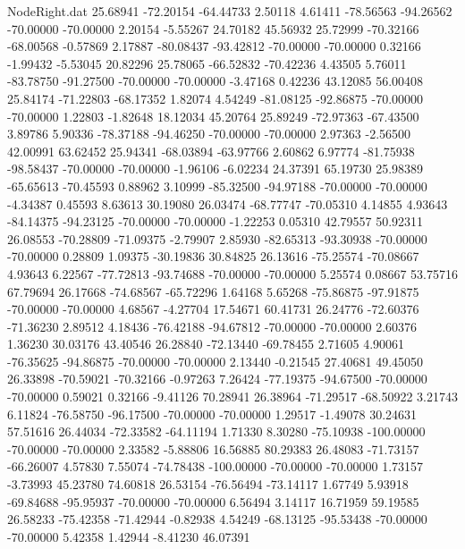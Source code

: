 \begin{filecontents}{NodeRight.dat}
  25.68941  -72.20154  -64.44733     2.50118    4.61411  -78.56563  -94.26562  -70.00000  -70.00000    2.20154   -5.55267   24.70182   45.56932
  25.72999  -70.32166  -68.00568    -0.57869    2.17887  -80.08437  -93.42812  -70.00000  -70.00000    0.32166   -1.99432   -5.53045   20.82296
  25.78065  -66.52832  -70.42236     4.43505    5.76011  -83.78750  -91.27500  -70.00000  -70.00000   -3.47168    0.42236   43.12085   56.00408
  25.84174  -71.22803  -68.17352     1.82074    4.54249  -81.08125  -92.86875  -70.00000  -70.00000    1.22803   -1.82648   18.12034   45.20764
  25.89249  -72.97363  -67.43500     3.89786    5.90336  -78.37188  -94.46250  -70.00000  -70.00000    2.97363   -2.56500   42.00991   63.62452
  25.94341  -68.03894  -63.97766     2.60862    6.97774  -81.75938  -98.58437  -70.00000  -70.00000   -1.96106   -6.02234   24.37391   65.19730
  25.98389  -65.65613  -70.45593     0.88962    3.10999  -85.32500  -94.97188  -70.00000  -70.00000   -4.34387    0.45593    8.63613   30.19080
  26.03474  -68.77747  -70.05310     4.14855    4.93643  -84.14375  -94.23125  -70.00000  -70.00000   -1.22253    0.05310   42.79557   50.92311
  26.08553  -70.28809  -71.09375    -2.79907    2.85930  -82.65313  -93.30938  -70.00000  -70.00000    0.28809    1.09375  -30.19836   30.84825
  26.13616  -75.25574  -70.08667     4.93643    6.22567  -77.72813  -93.74688  -70.00000  -70.00000    5.25574    0.08667   53.75716   67.79694
  26.17668  -74.68567  -65.72296     1.64168    5.65268  -75.86875  -97.91875  -70.00000  -70.00000    4.68567   -4.27704   17.54671   60.41731
  26.24776  -72.60376  -71.36230     2.89512    4.18436  -76.42188  -94.67812  -70.00000  -70.00000    2.60376    1.36230   30.03176   43.40546
  26.28840  -72.13440  -69.78455     2.71605    4.90061  -76.35625  -94.86875  -70.00000  -70.00000    2.13440   -0.21545   27.40681   49.45050
  26.33898  -70.59021  -70.32166    -0.97263    7.26424  -77.19375  -94.67500  -70.00000  -70.00000    0.59021    0.32166   -9.41126   70.28941
  26.38964  -71.29517  -68.50922     3.21743    6.11824  -76.58750  -96.17500  -70.00000  -70.00000    1.29517   -1.49078   30.24631   57.51616
  26.44034  -72.33582  -64.11194     1.71330    8.30280  -75.10938 -100.00000  -70.00000  -70.00000    2.33582   -5.88806   16.56885   80.29383
  26.48083  -71.73157  -66.26007     4.57830    7.55074  -74.78438 -100.00000  -70.00000  -70.00000    1.73157   -3.73993   45.23780   74.60818
  26.53154  -76.56494  -73.14117     1.67749    5.93918  -69.84688  -95.95937  -70.00000  -70.00000    6.56494    3.14117   16.71959   59.19585
  26.58233  -75.42358  -71.42944    -0.82938    4.54249  -68.13125  -95.53438  -70.00000  -70.00000    5.42358    1.42944   -8.41230   46.07391

\end{filecontents}
